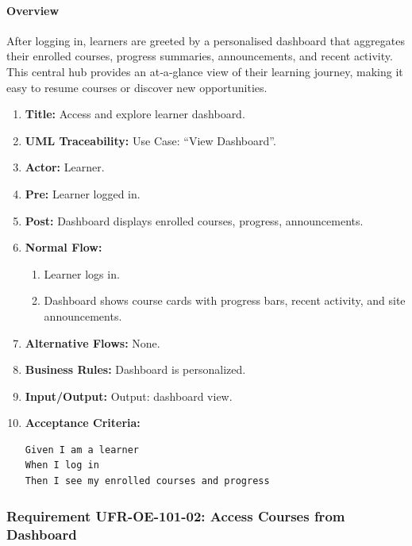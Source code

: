 \paragraph{Overview}
After logging in, learners are greeted by a personalised dashboard that aggregates their enrolled courses, progress summaries, announcements, and recent activity. This central hub provides an at‑a‑glance view of their learning journey, making it easy to resume courses or discover new opportunities.
\begin{enumerate}[label=\textbf{\arabic*.}]
\item \textbf{Title:} Access and explore learner dashboard.
\item \textbf{UML Traceability:} Use Case: “View Dashboard”.
\item \textbf{Actor:} Learner.
\item \textbf{Pre:} Learner logged in.
\item \textbf{Post:} Dashboard displays enrolled courses, progress, announcements.
\item \textbf{Normal Flow:} 
    \begin{enumerate}
        \item Learner logs in.
        \item Dashboard shows course cards with progress bars, recent activity, and site announcements.
    \end{enumerate}
\item \textbf{Alternative Flows:} None.
\item \textbf{Business Rules:} Dashboard is personalized.
\item \textbf{Input/Output:} Output: dashboard view.
\item \textbf{Acceptance Criteria:}
    \begin{verbatim}
Given I am a learner
When I log in
Then I see my enrolled courses and progress
    \end{verbatim}
\end{enumerate}

\subsubsection{Requirement UFR-OE-101-02: Access Courses from Dashboard}

